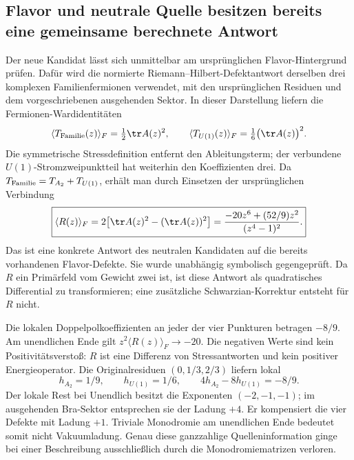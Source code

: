 \subsection{Flavor und neutrale Quelle besitzen bereits eine gemeinsame berechnete Antwort}\label{sec:jointneutralward}
Der neue Kandidat lässt sich unmittelbar am ursprünglichen Flavor-Hintergrund prüfen. Dafür wird die normierte Riemann--Hilbert-Defektantwort derselben drei komplexen Familienfermionen verwendet, mit den ursprünglichen Residuen und dem vorgeschriebenen ausgehenden Sektor. In dieser Darstellung liefern die Fermionen-Wardidentitäten
\begin{equation}
\langle T_{\rm Familie}(z)\rangle_F=\tfrac12\tr A(z)^2,
\qquad
\langle T_{U(1)}(z)\rangle_F=\tfrac16\bigl(\tr A(z)\bigr)^2.
\end{equation}
Die symmetrische Stressdefinition entfernt den Ableitungsterm; der verbundene $U(1)$-Stromzweipunktteil hat weiterhin den Koeffizienten drei. Da $T_{\rm Familie}=T_{A_2}+T_{U(1)}$, erhält man durch Einsetzen der ursprünglichen Verbindung
\begin{equation}\label{eq:jointRresponse}
\boxed{\langle R(z)\rangle_F
=2\bigl[\tr A(z)^2-(\tr A(z))^2\bigr]
=\frac{-20z^6+(52/9)z^2}{(z^4-1)^2}.}
\end{equation}
Das ist eine konkrete Antwort des neutralen Kandidaten auf die bereits vorhandenen Flavor-Defekte. Sie wurde unabhängig symbolisch gegengeprüft. Da $R$ ein Primärfeld vom Gewicht zwei ist, ist diese Antwort als quadratisches Differential zu transformieren; eine zusätzliche Schwarzian-Korrektur entsteht für $R$ nicht.

Die lokalen Doppelpolkoeffizienten an jeder der vier Punkturen betragen $-8/9$. Am unendlichen Ende gilt $z^2\langle R(z)\rangle_F\to-20$. Die negativen Werte sind kein Positivitätsverstoß: $R$ ist eine Differenz von Stressantworten und kein positiver Energieoperator. Die Originalresiduen $(0,1/3,2/3)$ liefern lokal
\begin{equation}
h_{A_2}=1/9,\qquad h_{U(1)}=1/6,\qquad
4h_{A_2}-8h_{U(1)}=-8/9.
\end{equation}
Der lokale Rest bei Unendlich besitzt die Exponenten $(-2,-1,-1)$; im ausgehenden Bra-Sektor entsprechen sie der Ladung $+4$. Er kompensiert die vier Defekte mit Ladung $+1$. Triviale Monodromie am unendlichen Ende bedeutet somit nicht Vakuumladung. Genau diese ganzzahlige Quelleninformation ginge bei einer Beschreibung ausschließlich durch die Monodromiematrizen verloren.

